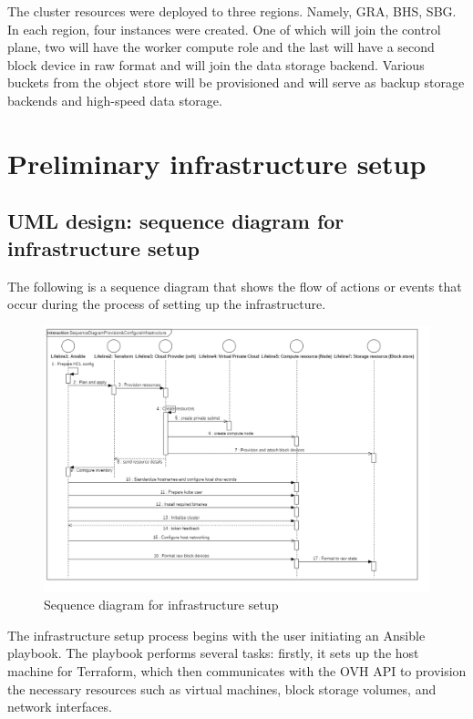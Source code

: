 \hspace{7mm}The cluster resources were deployed to three regions. Namely, GRA, BHS, SBG. In each region, four instances were created. One of which will join the control plane, two will have the worker compute role and the last will have a second block device in raw format and will join the data storage backend. Various buckets from the object store will be provisioned and will serve as backup storage backends and high-speed data storage.

\section{Preliminary infrastructure setup}

\subsection{UML design: sequence diagram for infrastructure setup}

\hspace{7mm}The following is a sequence diagram that shows the flow of actions or events that occur during the process of setting up the infrastructure.

\begin{figure}[H]\centering
\includegraphics[width=1.0\textwidth,angle=00]{assets/f16.png}
\caption{Sequence diagram for infrastructure setup}
\label{fig:Sequence diagram for infrastructure setup}
\end{figure}


\hspace{7mm}The infrastructure setup process begins with the user initiating an Ansible playbook. The playbook performs several tasks: firstly, it sets up the host machine for Terraform, which then communicates with the OVH API to provision the necessary resources such as virtual machines, block storage volumes, and network interfaces.

